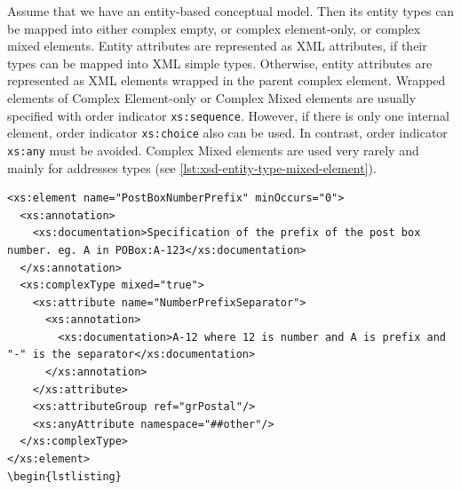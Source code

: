 Assume that we have an entity-based conceptual model.
Then its entity types can be mapped into either complex empty, or complex element-only, or complex mixed elements.
Entity attributes are represented as XML attributes, if their types can be mapped into XML simple types.
Otherwise, entity attributes are represented as XML elements wrapped in the parent complex element.
Wrapped elements of Complex Element-only or Complex Mixed elements are usually specified with order indicator \texttt{xs:sequence}.
However, if there is only one internal element, order indicator \texttt{xs:choice} also can be used.
In contrast, order indicator \texttt{xs:any} must be avoided.
Complex Mixed elements are used very rarely and mainly for addresses types (see \autoref{lst:xsd-entity-type-mixed-element}).

\begin{lstlisting}[caption={a},label=lst:xsd-entity-type-mixed-element]
<xs:element name="PostBoxNumberPrefix" minOccurs="0">
  <xs:annotation>
    <xs:documentation>Specification of the prefix of the post box number. eg. A in POBox:A-123</xs:documentation>
  </xs:annotation>
  <xs:complexType mixed="true">
    <xs:attribute name="NumberPrefixSeparator">
      <xs:annotation>
        <xs:documentation>A-12 where 12 is number and A is prefix and "-" is the separator</xs:documentation>
      </xs:annotation>
    </xs:attribute>
    <xs:attributeGroup ref="grPostal"/>
    <xs:anyAttribute namespace="##other"/>
  </xs:complexType>
</xs:element>
\begin{lstlisting}




\end{lstlisting}
